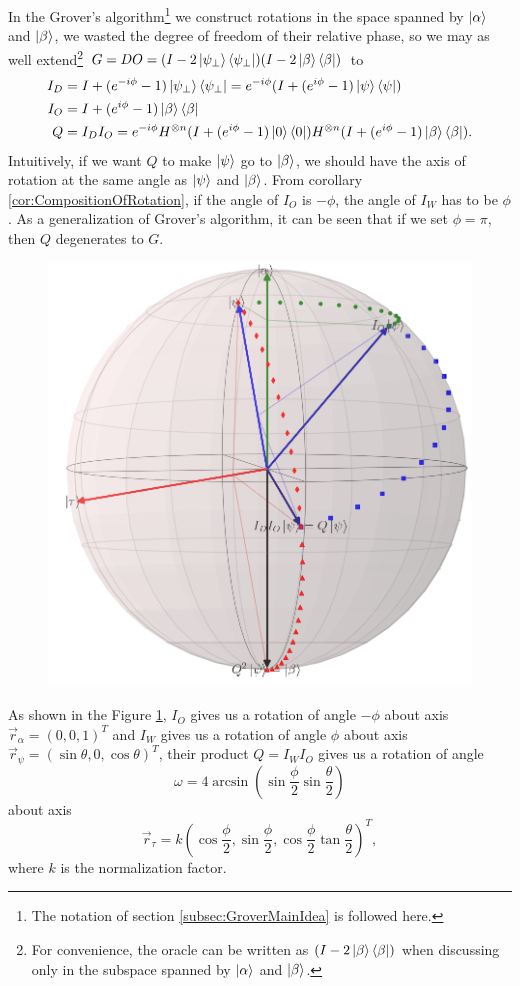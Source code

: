 \documentclass[a4paper,10pt]{book}
\numberwithin{equation}{section}
\begin{document}
In the Grover's algorithm\footnote{The notation of section \ref{subsec:GroverMainIdea} is followed here.} we construct rotations in the space spanned by $\ket{\alpha}$ and $\ket{\beta}$, we wasted the degree of freedom of their relative phase, so we may as well extend\footnote{For convenience, the oracle can be written as $(I-2\ket{\beta}\bra{\beta})$ when discussing only in the subspace spanned by $\ket{\alpha}$ and $\ket{\beta}$.} $G=DO=(I-2\ket{\psi_{\perp}}\bra{\psi_{\perp}})(I-2\ket{\beta}\bra{\beta})$ to
\begin{equation}
    \begin{split}
        I_{D} & = I+(e^{-i\phi}-1)\ket{\psi_{\perp}}\bra{\psi_{\perp}} = e^{-i\phi}(I+(e^{i\phi}-1)\ket{\psi}\bra{\psi})                   \\
        I_{O} & = I+(e^{i\phi}-1)\ket{\beta}\bra{\beta}                                                                                    \\
        Q     & = I_{D}I_{O} = e^{-i\phi}H^{\otimes n}(I+(e^{i\phi}-1)\ket{0}\bra{0})H^{\otimes n}(I+(e^{i\phi}-1)\ket{\beta}\bra{\beta}).
    \end{split}
\end{equation}
Intuitively, if we want $Q$ to make $\ket{\psi}$ go to $\ket{\beta}$, we should have the axis of rotation at the same angle as $\ket{\psi}$ and $\ket{\beta}$. From corollary \ref{cor:CompositionOfRotation}, if the angle of $I_{O}$ is $-\phi$, the angle of $I_{W}$ has to be $\phi$. As a generalization of Grover's algorithm, it can be seen that if we set $\phi=\pi$, then $Q$ degenerates to $G$.
\begin{figure}[h]
    \centering
    \includegraphics[width=0.5\columnwidth]{figures/Long.png}
    \caption{}
    \label{fig:long}
\end{figure}

As shown in the Figure \ref{fig:long}, $I_{O}$ gives us a rotation of angle $-\phi$ about axis $\vec{r}_{\alpha}=(0,0,1)^{T}$ and $I_{W}$ gives us a rotation of angle $\phi$ about axis $\vec{r}_{\psi}=(\sin\theta,0,\cos\theta)^{T}$, their product $Q=I_{W}I_{O}$ gives us a rotation of angle
\begin{equation}
    \omega=4\arcsin(\sin\frac{\phi}{2}\sin\frac{\theta}{2})
\end{equation}
about axis
\begin{equation}
    \vec{r}_{\tau}= k(\cos\frac{\phi}{2},\sin\frac{\phi}{2},\cos\frac{\phi}{2}\tan\frac{\theta}{2})^{T},
\end{equation}
where $k$ is the normalization factor.
\end{document}
